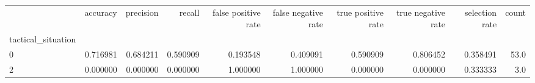 \begin{tabular}{lrrrrrrrrr}
\toprule
{} &  accuracy &  precision &    recall &  false positive rate &  false negative rate &  true positive rate &  true negative rate &  selection rate &  count \\
tactical\_situation &           &            &           &                      &                      &                     &                     &                 &        \\
\midrule
0                  &  0.716981 &   0.684211 &  0.590909 &             0.193548 &             0.409091 &            0.590909 &            0.806452 &        0.358491 &   53.0 \\
2                  &  0.000000 &   0.000000 &  0.000000 &             1.000000 &             1.000000 &            0.000000 &            0.000000 &        0.333333 &    3.0 \\
\bottomrule
\end{tabular}
